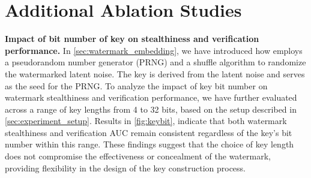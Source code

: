 \section{Additional Ablation Studies}
\vspace{3pt}
\textbf{Impact of bit number of key on stealthiness and verification performance.} 
In \cref{sec:watermark_embedding}, we have introduced how \tool{} employs a pseudorandom number generator (PRNG) and a shuffle algorithm to randomize the watermarked latent noise. The key is derived from the latent noise and serves as the seed for the PRNG. 
To analyze the impact of key bit number on watermark stealthiness and verification performance, we have further evaluated \tool across a range of key lengths from 4 to 32 bits, based on the setup described in \cref{sec:experiment_setup}. 
Results in \cref{fig:keybit}, indicate that both watermark stealthiness and verification AUC remain consistent regardless of the key's bit number within this range. These findings suggest that the choice of key length does not compromise the effectiveness or concealment of the watermark, providing flexibility in the design of the key construction process.


\begin{table}[t]
    \centering
    \caption{Impact of key construction on watermark verification AUC. The table compares results with (\Checkmark) and without (\XSolidBrush) the proposed key construction mechanism. Left to right are LDMs fine-tuned from SD v1-5/SD v2-1/SDXL 1.0.}

    \label{tab:key_construction}
\end{table}

